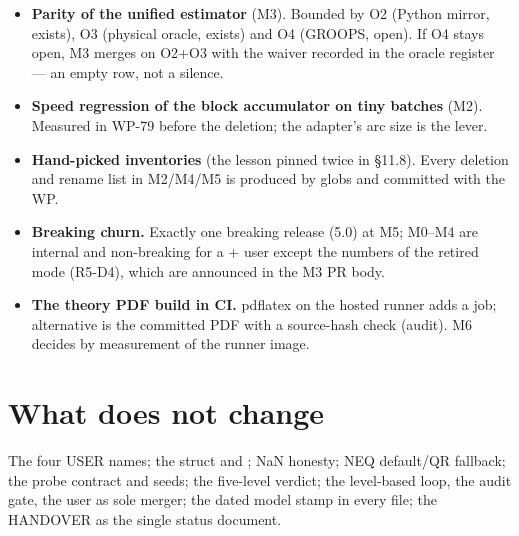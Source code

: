 \begin{itemize}
\item \textbf{Parity of the unified estimator} (M3). Bounded by O2 (Python mirror, exists), O3 (physical oracle, exists) and O4 (GROOPS, open). If O4 stays open, M3 merges on O2+O3 with the waiver recorded in the oracle register --- an empty row, not a silence.
\item \textbf{Speed regression of the block accumulator on tiny batches} (M2). Measured in WP-79 before the deletion; the adapter's arc size is the lever.
\item \textbf{Hand-picked inventories} (the lesson pinned twice in §11.8). Every deletion and rename list in M2/M4/M5 is produced by  globs and committed with the WP.
\item \textbf{Breaking churn.} Exactly one breaking release (5.0) at M5; M0--M4 are internal and non-breaking for a + user except the numbers of the retired  mode (R5-D4), which are announced in the M3 PR body.
\item \textbf{The theory PDF build in CI.} pdflatex on the hosted runner adds a job; alternative is the committed PDF with a source-hash check (audit). M6 decides by measurement of the runner image.
\end{itemize}

\section{What does not change}

The four USER names; the  struct and ; NaN honesty; NEQ default/QR fallback; the probe contract and seeds; the five-level verdict; the level-based loop, the audit gate, the user as sole merger; the dated model stamp in every file; the HANDOVER as the single status document.
